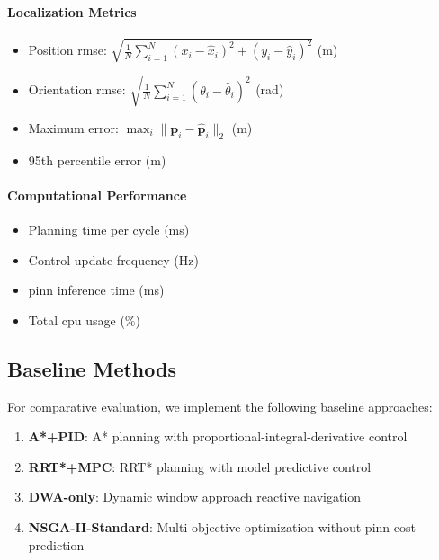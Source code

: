 \paragraph{Localization Metrics}
\begin{itemize}
    \item Position \acrshort{rmse}: $\sqrt{\frac{1}{N}\sum_{i=1}^N (x_i - \hat{x}_i)^2 + (y_i - \hat{y}_i)^2}$ (m)
    \item Orientation \acrshort{rmse}: $\sqrt{\frac{1}{N}\sum_{i=1}^N (\theta_i - \hat{\theta}_i)^2}$ (rad)
    \item Maximum error: $\max_i \|\mathbf{p}_i - \hat{\mathbf{p}}_i\|_2$ (m)
    \item 95th percentile error (m)
\end{itemize}

\paragraph{Computational Performance}
\begin{itemize}
    \item Planning time per cycle (ms)
    \item Control update frequency (Hz)
    \item \acrshort{pinn} inference time (ms)
    \item Total \acrshort{cpu} usage (\%)
\end{itemize}

\subsection{Baseline Methods}

For comparative evaluation, we implement the following baseline approaches:
\begin{enumerate}
    \item \textbf{A*+PID}: A* planning with proportional-integral-derivative control
    \item \textbf{RRT*+MPC}: RRT* planning with model predictive control
    \item \textbf{DWA-only}: Dynamic window approach reactive navigation
    \item \textbf{NSGA-II-Standard}: Multi-objective optimization without \acrshort{pinn} cost prediction
\end{enumerate}


